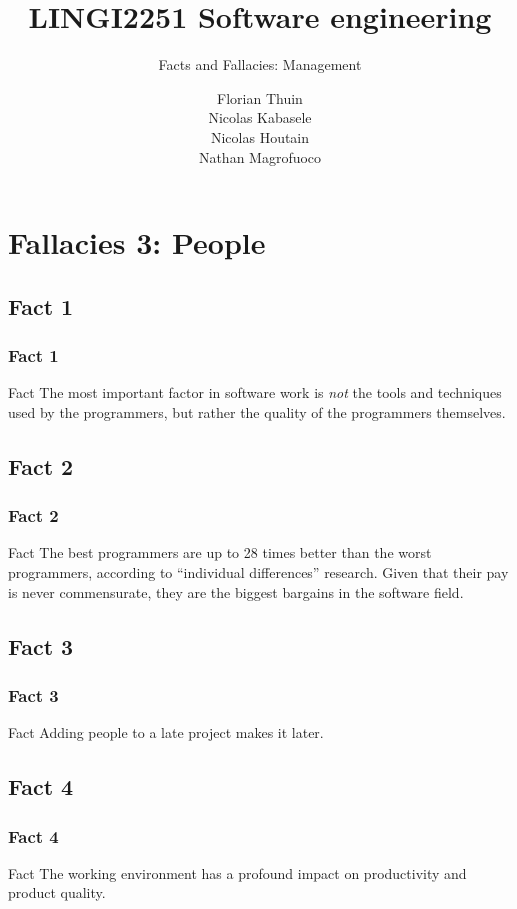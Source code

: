 \documentclass{beamer}
\title{LINGI2251 Software engineering}
\subtitle{Facts and Fallacies: Management}
\author{Florian Thuin \\ Nicolas Kabasele \\ Nicolas Houtain \\ Nathan Magrofuoco}
\institute{Ecole Polytechnique de Louvain}
\begin{document}
\begin{frame}[plain]
	\titlepage{}
\end{frame}



\section{Fallacies 3: People}

\subsection{Fact 1}
\begin{frame}
    \frametitle{Fact 1}
    \begin{block}{Fact}
        The most important factor in software work is \textit{not} the tools and
        techniques used by the programmers, but rather the quality of the
        programmers themselves.
    \end{block}
\end{frame}

\subsection{Fact 2}
\begin{frame}
    \frametitle{Fact 2}
    \begin{block}{Fact}
    The best programmers are up to 28 times better than the worst programmers,
    according to \enquote{individual differences} research. Given that
    their pay is never commensurate, they are the biggest bargains in the
    software field.
    \end{block}
\end{frame}

\subsection{Fact 3}
\begin{frame}
    \frametitle{Fact 3}
    \begin{block}{Fact}
    Adding people to a late project makes it later.
    \end{block}
\end{frame}

\subsection{Fact 4}
\begin{frame}
    \frametitle{Fact 4}
    \begin{block}{Fact}
    The working environment has a profound impact on productivity and product
    quality.
    \end{block}
\end{frame}
\end{document}
